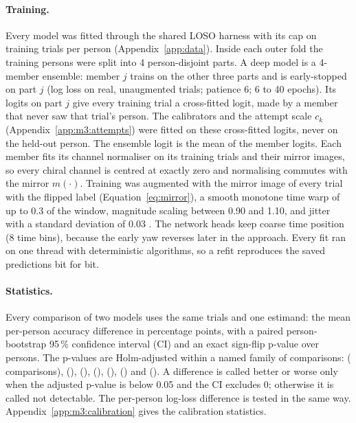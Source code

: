\paragraph{Training.}
Every model was fitted through the shared LOSO harness with its cap on training trials per person (Appendix~\ref{app:data}).
Inside each outer fold the training persons were split into 4 person-disjoint parts.
A deep model is a 4-member ensemble: member $j$ trains on the other three parts and is early-stopped on part $j$ (log loss on real, unaugmented trials; patience 6; 6 to 40 epochs).
Its logits on part $j$ give every training trial a cross-fitted logit, made by a member that never saw that trial's person.
The calibrators and the attempt scale $c_k$ (Appendix~\ref{app:m3:attempts}) were fitted on these cross-fitted logits, never on the held-out person.
The ensemble logit is the mean of the member logits.
Each member fits its channel normaliser on its training trials and their mirror images, so every chiral channel is centred at exactly zero and normalising commutes with the mirror $m(\cdot)$.
Training was augmented with the mirror image of every trial with the flipped label (Equation~\ref{eq:mirror}), a smooth monotone time warp of up to 0.3 of the window, magnitude scaling between 0.90 and 1.10, and jitter with a standard deviation of 0.03 \cite{um2017augmentation}.
The network heads keep coarse time position (8 time bins), because the early yaw reverses later in the approach.
Every fit ran on one thread with deterministic algorithms, so a refit reproduces the saved predictions bit for bit.

\paragraph{Statistics.}
Every comparison of two models uses the same trials and one estimand: the mean per-person accuracy difference in percentage points, with a paired person-bootstrap 95\,\% confidence interval (CI) and an exact sign-flip p-value over persons.
The p-values are Holm-adjusted within a named family of comparisons:
 ( comparisons),  (),  (),  (),  (),  () and  ().
A difference is called better or worse only when the adjusted p-value is below 0.05 and the CI excludes 0; otherwise it is called not detectable.
The per-person log-loss difference is tested in the same way.
Appendix~\ref{app:m3:calibration} gives the calibration statistics.

